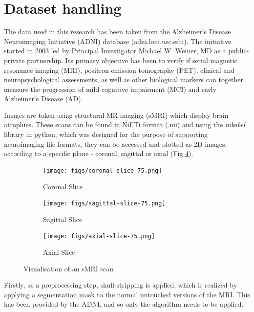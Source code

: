 \documentclass[a4paper, 12pt]{article}
\begin{document}
\newpage
\section{Dataset handling}
The data used in this research has been taken from the Alzheimer's Disease Neuroimaging Initiative (ADNI)
database (adni.loni.usc.edu). The initiative started in 2003 led by Principal Investigator Michael W. Weiner, MD
as a public-private partnership. Its primary objective has been to verify if serial magnetic resonance imaging (MRI),
positron emission tomography (PET), clinical and neuropsychological assessments, as well as other biological markers
can together measure the progression of mild cognitive impairment (MCI) and early Alzheimer's Disease (AD)\\
\cite{PMID20042704}

Images are taken using structural MR imaging (sMRI) which display brain atrophies. These scans can be found in
NiFTi format (.nii) and using the \textit{nibabel} library in python, which was designed for the purpose of
supporting neuroimaging file formats, they can be accessed and plotted as 2D images, according to a specific
plane - coronal, sagittal or axial (Fig \ref{fig:images}).

\begin{figure}[htbp]
    \centering
    \begin{subfigure}[b]{0.3\textwidth}
        \centering
        \texttt{[image: figs/coronal-slice-75.png]}
        \caption{Coronal Slice}
        \label{fig:sub1}
    \end{subfigure}
    \begin{subfigure}[b]{0.3\textwidth}
        \centering
        \texttt{[image: figs/sagittal-slice-75.png]}
        \caption{Sagittal Slice}
        \label{fig:sub2}
    \end{subfigure}
    \begin{subfigure}[b]{0.3\textwidth}
        \centering
        \texttt{[image: figs/axial-slice-75.png]}
        \caption{Axial Slice}
        \label{fig:sub3}
    \end{subfigure}
    \caption{Visualisation of an sMRI scan}
    \label{fig:images}
\end{figure}

Firstly, as a preprocessing step, skull-stripping is applied, which is realized by applying a segmentation mask
to the normal untouched versions of the MRI. This has been provided by the ADNI, and so only the algorithm
needs to be applied.
\end{document}
